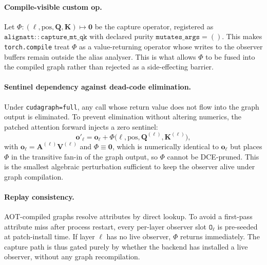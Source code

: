 \documentclass[11pt,twocolumn]{article}
\begin{document}
\paragraph{Compile-visible custom op.}
Let $\Phi : (\ell, \mathrm{pos}, \mathbf{Q}, \mathbf{K}) \mapsto \mathbf{0}$
be the capture operator, registered as
$\mathtt{alignatt{::}capture\_mt\_qk}$ with declared purity
$\mathtt{mutates\_args=()}$. This makes \texttt{torch.compile} treat $\Phi$
as a value-returning operator whose
writes to the observer buffers remain outside the alias analyser. This is what
allows $\Phi$ to be fused into the compiled graph rather than rejected as a
side-effecting barrier.

\paragraph{Sentinel dependency against dead-code elimination.}
Under \texttt{cudagraph=full}, any call whose return value does not flow into
the graph output is eliminated. To prevent elimination without altering
numerics, the patched attention forward injects a zero sentinel:
\begin{equation}
  \mathbf{o}'_\ell = \mathbf{o}_\ell + \Phi\bigl(\ell, \mathrm{pos}, \mathbf{Q}^{(\ell)}, \mathbf{K}^{(\ell)}\bigr),
  \label{eq:sentinel}
\end{equation}
with $\mathbf{o}_\ell = \mathbf{A}^{(\ell)} \mathbf{V}^{(\ell)}$ and $\Phi \equiv \mathbf{0}$,
which is numerically identical to $\mathbf{o}_\ell$ but places $\Phi$ in the
transitive fan-in of the graph output, so $\Phi$ cannot be DCE-pruned. This
is the smallest algebraic perturbation sufficient to keep the observer alive
under graph compilation.

\paragraph{Replay consistency.}
AOT-compiled graphs resolve attributes by direct lookup. To avoid a first-pass
attribute miss after process restart, every
per-layer observer slot $\mathtt{O}_\ell$ is pre-seeded at patch-install
time. If layer $\ell$ has no live observer, $\Phi$ returns immediately. The
capture path is thus
gated purely by whether the backend has installed a live observer, without
any graph recompilation.
\end{document}
